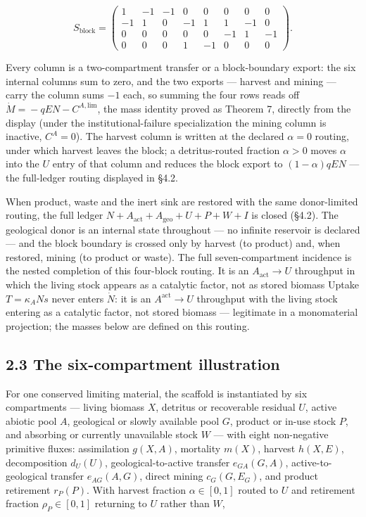 \documentclass[11pt]{article}
\begin{document}
$$S_{\mathrm{block}} = \begin{pmatrix} 1 & -1 & -1 & 0 & 0 & 0 & 0 & 0 \\ -1 & 1 & 0 & -1 & 1 & 1 & -1 & 0 \\ 0 & 0 & 0 & 0 & 0 & -1 & 1 & -1 \\ 0 & 0 & 0 & 1 & -1 & 0 & 0 & 0 \end{pmatrix}.$$

 Every column is a two-compartment transfer or a block-boundary export: the six internal columns sum to zero, and the two exports --- harvest and mining --- carry the column sums \(-1\) each, so summing the four rows reads off \(\dot M =\allowbreak{} -qEN - C^{A,\allowbreak{}\mathrm{lim}}\), the mass identity proved as Theorem 7, directly from the display (under the institutional-failure specialization the mining column is inactive, \(C^A = 0\)). The harvest column is written at the declared \(\alpha=0\) routing, under which harvest leaves the block; a detritus-routed fraction \(\alpha>0\) moves \(\alpha\) into the \(U\) entry of that column and reduces the block export to \((1-\alpha)qEN\) --- the full-ledger routing displayed in \S4.2.

When product, waste and the inert sink are restored with the same donor-limited routing, the full ledger \(N+\allowbreak{}A_{\mathrm{act}}+\allowbreak{}A_{\mathrm{geo}}+\allowbreak{}U+\allowbreak{}P+\allowbreak{}W+\allowbreak{}I\) is closed (\S4.2). The geological donor is an internal state throughout --- no infinite reservoir is declared --- and the block boundary is crossed only by harvest (to product) and, when restored, mining (to product or waste). The full seven-compartment incidence is the nested completion of this four-block routing. It is an \(A_{\mathrm{act}}\to U\) throughput in which the living stock appears as a catalytic factor, not as stored biomass Uptake \(T = \kappa_A N s\) never enters \(\dot N\): it is an \(A^{\mathrm{act}} \to U\) throughput with the living stock entering as a catalytic factor, not stored biomass --- legitimate in a monomaterial projection; the masses below are defined on this routing.

\subsection*{2.3 The six-compartment illustration}\label{23-the-six-compartment-illustration}

For one conserved limiting material, the scaffold is instantiated by six compartments --- living biomass \(X\), detritus or recoverable residual \(U\), active abiotic pool \(A\), geological or slowly available pool \(G\), product or in-use stock \(P\), and absorbing or currently unavailable stock \(W\) --- with eight non-negative primitive fluxes: assimilation \(g(X,A)\), mortality \(m(X)\), harvest \(h(X,E)\), decomposition \(d_U(U)\), geological-to-active transfer \(e_{GA}(G,A)\), active-to-geological transfer \(e_{AG}(A,G)\), direct mining \(c_G(G,E_G)\), and product retirement \(r_P(P)\). With harvest fraction \(\alpha \in [0,1]\) routed to \(U\) and retirement fraction \(\rho_P \in [0,1]\) returning to \(U\) rather than \(W\), 
\end{document}
